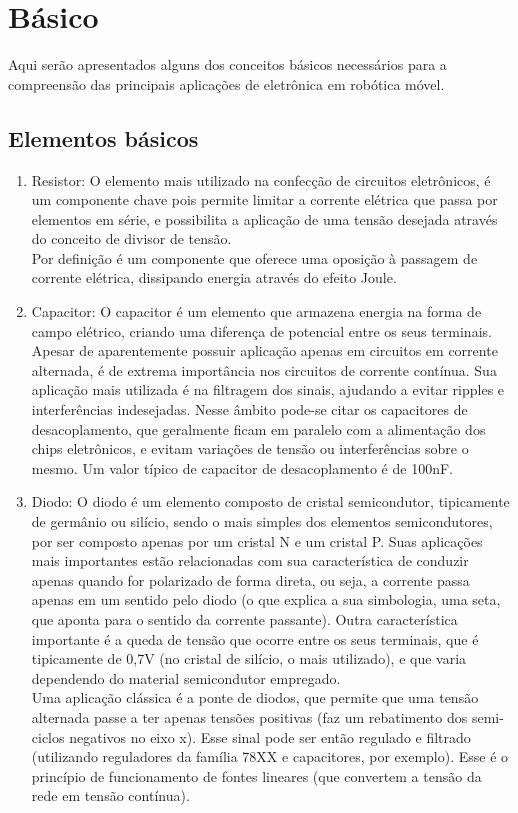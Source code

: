 \section{B\'asico}

Aqui ser\~ao apresentados alguns dos conceitos b\'asicos necess\'arios para a compreens\~ao das principais aplicaç\~oes de eletr\^onica em rob\'otica m\'ovel.

\subsection{Elementos b\'asicos}


\begin{enumerate}
\item Resistor:
	O elemento mais utilizado na confecç\~ao de circuitos eletr\^onicos, é um componente chave pois permite limitar a corrente el\'etrica que passa por elementos em s\'erie, e possibilita a aplicaç\~ao de uma tens\~ao desejada atrav\'es do conceito de divisor de tens\~ao.
		\\Por definiç\~ao \'e um componente que oferece uma oposiç\~ao \`a passagem de corrente el\'etrica, dissipando energia atrav\'es do efeito Joule.
		
\item Capacitor: 
	O capacitor \'e um elemento que armazena energia na forma de campo el\'etrico, criando uma diferença de potencial entre os seus terminais. Apesar de aparentemente possuir aplicaç\~ao apenas em circuitos em corrente alternada, \'e de extrema import\^ancia nos circuitos de corrente cont\'inua. Sua aplicaç\~ao mais utilizada \'e na filtragem dos sinais, ajudando a evitar ripples e interfer\^encias indesejadas. Nesse \^ambito pode-se citar os capacitores de desacoplamento, que geralmente ficam em paralelo com a alimentaç\~ao dos chips eletr\^onicos, e evitam variaç\~oes de tens\~ao ou interfer\^encias sobre o mesmo. Um valor t\'ipico de capacitor de desacoplamento \'e de 100nF.
	
\item Diodo:
	O diodo \'e um elemento composto de cristal semicondutor, tipicamente de germ\^anio ou sil\'icio, sendo o mais simples dos elementos semicondutores, por ser composto apenas por um cristal N e um cristal P. Suas aplicaç\~oes mais importantes est\~ao relacionadas com sua caracter\'istica de conduzir apenas quando for polarizado de forma direta, ou seja, a corrente passa apenas em um sentido pelo diodo (o que explica a sua simbologia, uma seta, que aponta para o sentido da corrente passante). Outra caracter\'istica importante \'e a queda de tens\~ao que ocorre entre os seus terminais, que \'e tipicamente de 0,7V (no cristal de sil\'icio, o mais utilizado), e que varia dependendo do material semicondutor empregado.
	\\Uma aplicação cl\'assica \'e a ponte de diodos, que permite que uma tens\~ao alternada passe a ter apenas tens\~oes positivas (faz um rebatimento dos semi-ciclos negativos no eixo x). Esse sinal pode ser então regulado e filtrado (utilizando reguladores da fam\'ilia 78XX e capacitores, por exemplo). Esse \'e o princ\'ipio de funcionamento de fontes lineares (que convertem a tens\~ao da rede em tens\~ao cont\'inua).
	

\end{enumerate}
